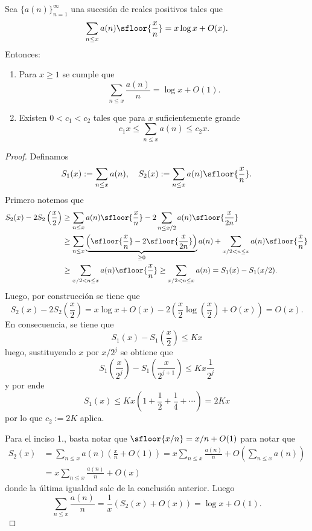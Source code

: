\documentclass[teoria-numeros.tex]{subfiles}
\begin{document}
\begin{thm}[Shapiro]
	Sea $\{a(n)\}_{n=1}^\infty$ una sucesión de reales positivos tales que
	$$ \sum_{n \le x} a(n) \sfloor{\frac{x}{n}} = x\log x + O(x). $$
	Entonces:
	\begin{enumerate}
		\item Para $x\ge 1$ se cumple que
			$$ \sum_{n \le x} \frac{a(n)}{n} = \log x + O(1). $$
		\item Existen $0 < c_1 < c_2$ tales que para $x$ suficientemente grande
			$$ c_1x \le \sum_{n \le x} a(n) \le c_2x. $$
	\end{enumerate}
\end{thm}
\begin{proof}
	Definamos
	$$ S_1(x) := \sum_{n \le x} a(n), \quad S_2(x) := \sum_{n\le x} a(n)\sfloor{\frac{x}{n}}. $$
	Primero notemos que
	\begin{align*}
		S_2(x) - 2S_2\left( \frac{x}{2} \right) &\ge \sum_{n\le x} a(n)\sfloor{\frac{x}{n}} - 2\sum_{n\le x/2} a(n)\sfloor{\frac{x}{2n}} \\
		&\ge \sum_{n\le x} \underbrace{ \left( \sfloor{\frac{x}{n}} - 2\sfloor{\frac{x}{2n}} \right) }_{\ge 0} a(n)
		+ \sum_{x/2 < n \le x} a(n)\sfloor{\frac{x}{n}} \\
		&\ge \sum_{x/2 < n \le x} a(n)\sfloor{\frac{x}{n}} \ge \sum_{x/2 < n \le x} a(n) = S_1(x) - S_1(x/2).
	\end{align*}
	Luego, por construcción se tiene que
	$$ S_2(x) - 2S_2\left( \frac{x}{2} \right) = x\log x + O(x) - 2\left( \frac{x}{2}\log\left( \frac{x}{2} \right) + O(x) \right) = O(x). $$
	En consecuencia, se tiene que
	$$ S_1(x) - S_1\left( \frac{x}{2} \right) \le Kx $$
	luego, sustituyendo $x$ por $x/2^j$ se obtiene que
	$$ S_1\left( \frac{x}{2^j} \right) - S_1\left( \frac{x}{2^{j+1}} \right) \le Kx \frac{1}{2^j} $$
	y por ende
	$$ S_1(x) \le Kx\left( 1 + \frac{1}{2} + \frac{1}{4} + \cdots \right) = 2Kx $$
	por lo que $c_2 := 2K$ aplica.

	Para el inciso 1., basta notar que $\sfloor{x/n} = x/n + O(1)$ para notar que
	\begin{align*}
		S_2(x) &= \sum_{n\le x} a(n) \left( \frac{x}{n} + O(1) \right) = x\sum_{n\le x} \frac{a(n)}{n} + O\left( \sum_{n\le x} a(n) \right) \\
		&= x\sum_{n\le x} \frac{a(n)}{n} + O(x)
	\end{align*}
	donde la última igualdad sale de la conclusión anterior.
	Luego
	$$ \sum_{n\le x} \frac{a(n)}{n} = \frac{1}{x}( S_2(x) + O(x) ) = \log x + O(1). $$


\end{proof}
\end{document}
